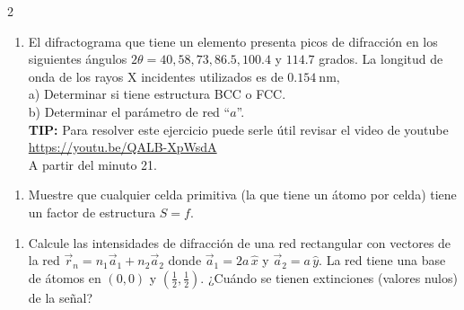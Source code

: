 \documentclass{article}
\begin{document}
\begin{multicols}{2}
\begin{enumerate}[label={{\textcolor{trueblue}{\textbf{Ej}. \arabic*.0}}}, start=8]
    \item El difractograma que tiene un elemento presenta picos de difracción en los siguientes ángulos \(2\theta= 40, 58, 73, 86.5, 100.4\) y \(114.7\) grados. La longitud de onda de los rayos X incidentes utilizados es de \(0.154\ \mathrm{nm},\)\\
    a) Determinar si tiene estructura BCC o FCC.\\
    b) Determinar el parámetro de red “\(a\)”.\\
    \textbf{TIP:} Para resolver este ejercicio puede serle útil revisar el video de youtube \url{https://youtu.be/QALB-XpWsdA}\\
    A partir del minuto 21.
\end{enumerate}

\begin{enumerate}[label={{\textcolor{trueblue}{\textbf{Ej}. \arabic*.0}}}, start=9]
    \item Muestre que cualquier celda primitiva (la que tiene un átomo por celda) tiene un factor de estructura \(S=f\).
\end{enumerate}

\begin{enumerate}[label={{\textcolor{trueblue}{\textbf{Ej}. \arabic*.0}}}, start=10]
    \item Calcule las intensidades de difracción de una red rectangular con vectores de la red \(\vec{r}_n = n_1 \vec{a}_1 + n_2 \vec{a}_2\) donde \(\vec{a}_1 = 2a\,\hat{x}\) y \(\vec{a}_2 = a\,\hat{y}\). La red tiene una base de átomos en \((0,0)\) y \((\tfrac{1}{2}, \tfrac{1}{2})\). ¿Cuándo se tienen extinciones (valores nulos) de la señal?
\end{enumerate}

\end{multicols}


\tableofcontents \newpage

\begin{center}
\end{center}  \vspace{2cm}
\end{document}
